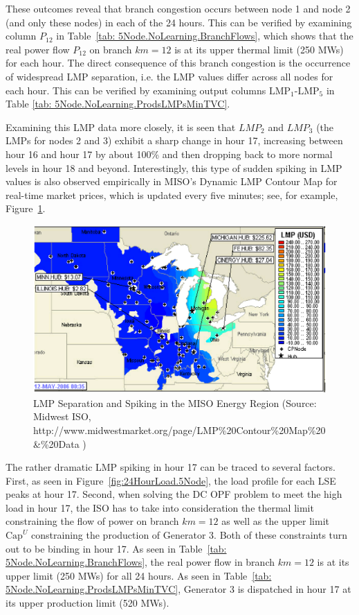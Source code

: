 \documentclass[12pt]{article}
\begin{document}
These outcomes reveal that branch congestion occurs between node 1 and node 2 (and only these nodes) in each of the 24 hours.  This can be verified by examining column $P_{12}$ in Table~\ref{tab: 5Node.NoLearning.BranchFlows}, which shows that the real power flow $P_{12}$ on branch $km=12$ is at its upper thermal limit (250 MWs) for each hour.  The direct consequence of this branch congestion is the occurrence of widespread LMP separation, i.e. the LMP values differ across all nodes for each hour.  This can be verified by examining output columns $\mbox{LMP}_1$-$\mbox{LMP}_5$ in Table \ref{tab: 5Node.NoLearning.ProdsLMPsMinTVC}.  

     Examining this LMP data more closely, it is seen that $LMP_{2}$ and $LMP_{3}$ (the LMPs for nodes 2 and 3) exhibit a sharp change in hour 17, increasing between hour 16 and hour 17 by about 100\%
and then dropping back to more normal levels in hour 18 and beyond.  Interestingly, this type of sudden spiking in LMP values is also observed empirically in MISO's Dynamic LMP Contour Map for real-time market prices, which is updated every five minutes; see, for example, Figure~\ref{fig:MISOLMP}.


\begin{figure}
	\centering
		\includegraphics[totalheight = 8.5cm]{MISOLMP.MichiganCongestion.eps}
	\caption{LMP Separation and Spiking in the MISO Energy Region (Source: 
                Midwest ISO, http://www.midwestmarket.org/page/LMP\%20Contour\%20Map\%20\&\%20Data ) }
	\label{fig:MISOLMP}
\end{figure} 

     
     The rather dramatic LMP spiking in hour 17 can be traced to several factors. First, as seen in 
Figure~\ref{fig:24HourLoad.5Node}, the load profile for each LSE peaks at hour 17.  Second, when solving the DC OPF problem to meet the high load in hour 17, the ISO has to take into consideration the thermal limit constraining the flow of power on branch $km=12$ as well as the upper limit $\mbox{Cap}^U$ constraining the production of Generator 3.
Both of these constraints turn out to be binding in hour 17.  As seen in Table~\ref{tab: 5Node.NoLearning.BranchFlows}, the real power flow in branch $km=12$ is at its upper limit (250 MWs) for all 24 hours.  As seen in Table~\ref{tab: 5Node.NoLearning.ProdsLMPsMinTVC}, Generator 3 is dispatched in hour 17 at its upper production limit (520 MWs). 
\end{document}
